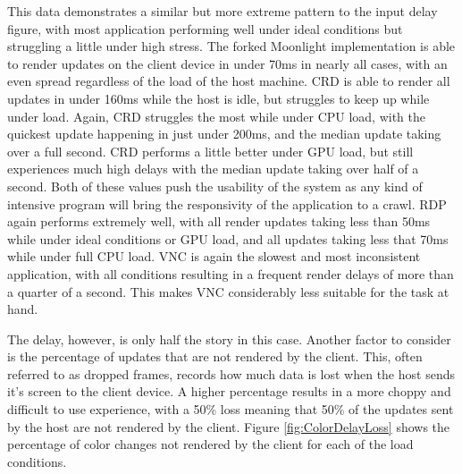 This data demonstrates a similar but more extreme pattern to the input delay figure, with most application performing well under ideal conditions but struggling a little under high stress.
The forked Moonlight implementation is able to render updates on the client device in under 70ms in nearly all cases, with an even spread regardless of the load of the host machine.
CRD is able to render all updates in under 160ms while the host is idle, but struggles to keep up while under load.
Again, CRD struggles the most while under CPU load, with the quickest update happening in just under 200ms, and the median update taking over a full second.
CRD performs a little better under GPU load, but still experiences much high delays with the median update taking over half of a second.
Both of these values push the usability of the system as any kind of intensive program will bring the responsivity of the application to a crawl.
RDP again performs extremely well, with all render updates taking less than 50ms while under ideal conditions or GPU load, and all updates taking less that 70ms while under full CPU load.
VNC is again the slowest and most inconsistent application, with all conditions resulting in a frequent render delays of more than a quarter of a second.
This makes VNC considerably less suitable for the task at hand.

The delay, however, is only half the story in this case.
Another factor to consider is the percentage of updates that are not rendered by the client.
This, often referred to as dropped frames, records how much data is lost when the host sends it's screen to the client device.
A higher percentage results in a more choppy and difficult to use experience, with a 50\% loss meaning that 50\% of the updates sent by the host are not rendered by the client.
Figure \ref{fig:ColorDelayLoss} shows the percentage of color changes not rendered by the client for each of the load conditions.

